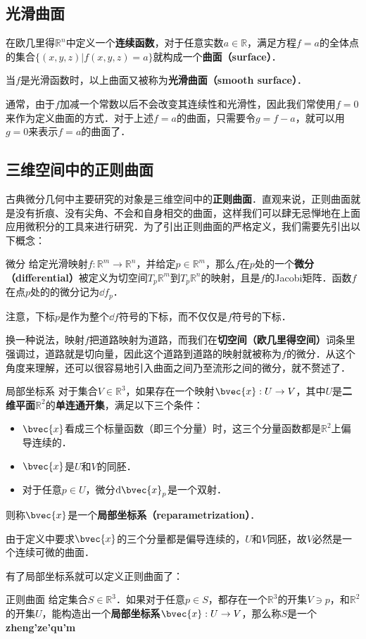 
\subsection{光滑曲面}

在欧几里得$\mathbb{R}^n$中定义一个\textbf{连续函数}，对于任意实数$a\in\mathbb{R}$，满足方程$f=a$的全体点的集合$\{(x, y, z)|f(x, y, z)=a\}$就构成一个\textbf{曲面（surface）}．

当$f$是光滑函数时，以上曲面又被称为\textbf{光滑曲面（smooth surface）}．

通常，由于$f$加减一个常数以后不会改变其连续性和光滑性，因此我们常使用$f=0$来作为定义曲面的方式．对于上述$f=a$的曲面，只需要令$g=f-a$，就可以用$g=0$来表示$f=a$的曲面了．

\subsection{三维空间中的正则曲面}

古典微分几何中主要研究的对象是三维空间中的\textbf{正则曲面}．直观来说，正则曲面就是没有折痕、没有尖角、不会和自身相交的曲面，这样我们可以肆无忌惮地在上面应用微积分的工具来进行研究．为了引出正则曲面的严格定义，我们需要先引出以下概念：

\begin{definition}{微分}
给定光滑映射$f:\mathbb{R}^m\to\mathbb{R}^n$，并给定$p\in\mathbb{R}^m$，那么$f$在$p$处的一个\textbf{微分（differential）}被定义为切空间$T_p\mathbb{R}^m$到$T_p\mathbb{R}^n$的映射，且是$f$的Jacobi矩阵．函数$f$在点$p$处的的微分记为$\dd f_p$．
\end{definition}

注意，下标$p$是作为整个$\dd f$符号的下标，而不仅仅是$f$符号的下标．

换一种说法，映射$f$把道路映射为道路，而我们在\textbf{切空间（欧几里得空间）}词条里强调过，道路就是切向量，因此这个道路到道路的映射就被称为$f$的微分．从这个角度来理解，还可以很容易地引入曲面之间乃至流形之间的微分，就不赘述了．


\begin{definition}{局部坐标系}
对于集合$V\in \mathbb{R}^3$，如果存在一个映射$\bvec{x}:U\to V$，其中$U$是\textbf{二维平面}$\mathbb{R}^2$的\textbf{单连通开集}，满足以下三个条件：
\begin{itemize}
\item $\bvec{x}$看成三个标量函数（即三个分量）时，这三个分量函数都是$\mathbb{R}^2$上偏导连续的．
\item $\bvec{x}$是$U$和$V$的同胚．
\item 对于任意$p\in U$，微分$\mathrm{d}\bvec{x}_p$是一个双射．
\end{itemize}
则称$\bvec{x}$是一个\textbf{局部坐标系（reparametrization）}．
\end{definition}

由于定义中要求$\bvec{x}$的三个分量都是偏导连续的，$U$和$V$同胚，故$V$必然是一个连续可微的曲面．

有了局部坐标系就可以定义正则曲面了：

\begin{definition}{正则曲面}
给定集合$S\in\mathbb{R}^3$．如果对于任意$p\in S$，都存在一个$\mathbb{R}^3$的开集$V\ni p$，和$\mathbb{R}^2$的开集$U$，能构造出一个\textbf{局部坐标系}$\bvec{x}:U\to V$，那么称$S$是一个\textbf{zheng'ze'qu'm}
\end{definition}
